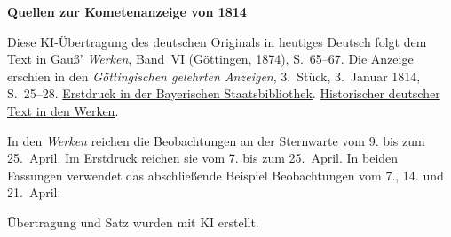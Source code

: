 \clearpage\thispagestyle{empty}
\begin{center}\textbf{Quellen zur Kometenanzeige von 1814}\end{center}
\noindent Diese KI-Übertragung des deutschen Originals in heutiges Deutsch folgt dem Text in Gauß’ \textit{Werken}, Band~VI (Göttingen, 1874), S.~65--67. Die Anzeige erschien in den \textit{Göttingischen gelehrten Anzeigen}, 3.~Stück, 3.~Januar 1814, S.~25--28. \href{https://www.digitale-sammlungen.de/de/view/bsb10538685?page=31}{Erstdruck in der Bayerischen Staatsbibliothek}. \href{https://gdz.sub.uni-goettingen.de/id/PPN236007467}{Historischer deutscher Text in den Werken}.
\par\smallskip\noindent In den \textit{Werken} reichen die Beobachtungen an der Sternwarte vom 9. bis zum 25.~April. Im Erstdruck reichen sie vom 7. bis zum 25.~April. In beiden Fassungen verwendet das abschließende Beispiel Beobachtungen vom 7., 14. und 21.~April.
\par\smallskip\noindent Übertragung und Satz wurden mit KI erstellt.
\clearpage

